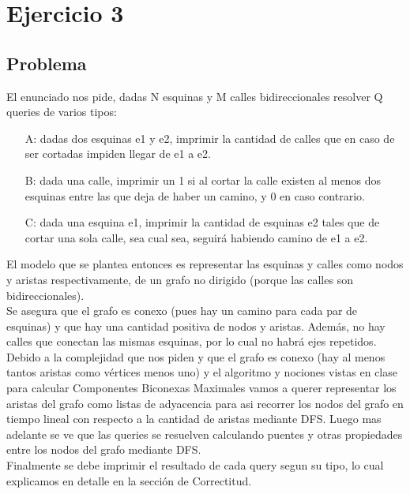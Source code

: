 \section{Ejercicio 3}

\subsection{Problema}

El enunciado nos pide, dadas N esquinas y M calles bidireccionales resolver Q queries de varios tipos:
\begin{itemize}
	\item[A: ] dadas dos esquinas e1 y e2, imprimir la cantidad de calles que en caso de ser cortadas impiden llegar de e1 a e2.
	\item[B: ] dada una calle, imprimir un 1 si al cortar la calle existen al menos dos esquinas entre las que deja de haber un camino, y 0 en caso contrario.
	\item[C: ] dada una esquina e1, imprimir la cantidad de esquinas e2 tales que de cortar una sola calle, sea cual sea, seguir\'a habiendo camino de e1 a e2.
\end{itemize}

El modelo que se plantea entonces es representar las esquinas y calles como nodos y aristas respectivamente, de un grafo no dirigido
(porque las calles son bidireccionales).\\

Se asegura que el grafo es conexo (pues hay un camino para cada par de esquinas) y que hay una cantidad positiva de nodos y aristas.
Además, no hay calles que conectan las mismas esquinas, por lo cual no habrá ejes repetidos. \\

Debido a la complejidad que nos piden y que el grafo es conexo (hay al menos tantos aristas como vértices menos uno) y el algoritmo y nociones
vistas en clase para calcular Componentes Biconexas Maximales vamos a querer representar los aristas del grafo como listas de adyacencia para asi 
recorrer los nodos del grafo en tiempo lineal con respecto a la cantidad de aristas mediante DFS. Luego mas adelante se ve que las queries se resuelven
calculando puentes y otras propiedades entre los nodos del grafo mediante DFS. \\

Finalmente se debe imprimir el resultado de cada query segun su tipo, lo cual explicamos en detalle en la sección de Correctitud. \\

